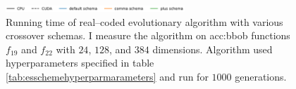 \begin{figure}[ht!]
    \begin{minipage}{\textwidth}
        \centering
        \includegraphics[width=0.6\textwidth]{img/runs/time_es_schema_legend.pdf}
    \end{minipage}

    \caption[Running time of crossover schemas]{Running time of real--coded evolutionary algorithm with various crossover schemas. I measure the algorithm on \acrshort{acc:bbob} functions $f_{19}$ and $f_{22}$ with $24$, $128$, and $384$ dimensions. Algorithm used hyperparameters specified in table \ref{tab:esschemehyperparmarameters} and run for $1000$ generations.}
\end{figure}




